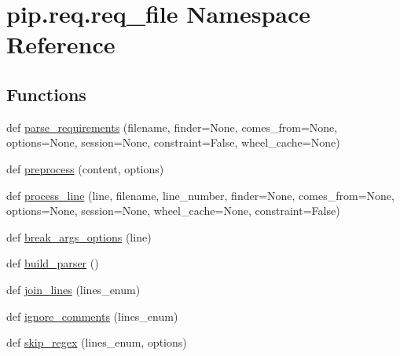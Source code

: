 \hypertarget{namespacepip_1_1req_1_1req__file}{}\section{pip.\+req.\+req\+\_\+file Namespace Reference}
\label{namespacepip_1_1req_1_1req__file}
\subsection*{Functions}
\begin{DoxyCompactItemize}
\item 
def \hyperlink{namespacepip_1_1req_1_1req__file_a7600c5f923de1a1a46ad8541b9bd3084}{parse\+\_\+requirements} (filename, finder=None, comes\+\_\+from=None, options=None, session=None, constraint=False, wheel\+\_\+cache=None)
\item 
def \hyperlink{namespacepip_1_1req_1_1req__file_ac799b15c47125fbf6f77cf0d9ffbe772}{preprocess} (content, options)
\item 
def \hyperlink{namespacepip_1_1req_1_1req__file_ab31bf471d559b7e62eeefa77fe230dd2}{process\+\_\+line} (line, filename, line\+\_\+number, finder=None, comes\+\_\+from=None, options=None, session=None, wheel\+\_\+cache=None, constraint=False)
\item 
def \hyperlink{namespacepip_1_1req_1_1req__file_ac5064ff435fdfbb72795742c823172ba}{break\+\_\+args\+\_\+options} (line)
\item 
def \hyperlink{namespacepip_1_1req_1_1req__file_a2fd1f4a7059671471a6440d046283ac8}{build\+\_\+parser} ()
\item 
def \hyperlink{namespacepip_1_1req_1_1req__file_aea661e701d2523cfccf634f57ce1b5ff}{join\+\_\+lines} (lines\+\_\+enum)
\item 
def \hyperlink{namespacepip_1_1req_1_1req__file_a4f437b109d9611da9924cfcf8c081dc9}{ignore\+\_\+comments} (lines\+\_\+enum)
\item 
def \hyperlink{namespacepip_1_1req_1_1req__file_a71e94b4017adf080ca2de297a0e39d54}{skip\+\_\+regex} (lines\+\_\+enum, options)
\end{DoxyCompactItemize}
